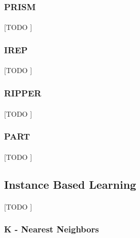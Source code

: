 \documentclass{article}
\begin{document}
			\subsubsection{PRISM}
			\label{sec:prism-rule-based}

				\paragraph{}
				[TODO ]

			\subsubsection{IREP}
			\label{sec:irep-rule-based}

				\paragraph{}
				[TODO ]

			\subsubsection{RIPPER}
			\label{sec:ripper-rule-based}

				\paragraph{}
				[TODO ]

			\subsubsection{PART}
			\label{sec:part-rule-based}

				\paragraph{}
				[TODO ]

		\subsection{Instance Based Learning}
		\label{sec:decision-trees}

			\paragraph{}
			[TODO ]

			\subsubsection{K - Nearest Neighbors}
			\label{sec:knn}
\end{document}
